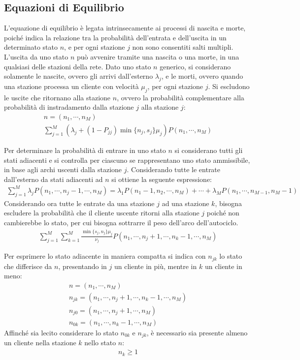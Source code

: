 \documentclass{article}
\numberwithin{equation}{subsection}
\begin{document}
\subsection{Equazioni di Equilibrio}

L'equazione di equilibrio è legata intrinsecamente ai processi di nascita e morte, poiché indica la relazione tra la probabilità dell'entrata e dell'uscita in un determinato 
stato $n$, e per ogni stazione $j$ non sono consentiti salti multipli. L'uscita da uno stato $n$ può avvenire tramite una nascita o una morte, in una qualsiasi delle stazioni della rete. Dato uno stato $n$ generico, si considerano  
solamente le nascite, ovvero gli arrivi dall'esterno $\lambda_j$, e le morti, ovvero quando una stazione processa un cliente con velocità $\mu_j$, per ogni stazione $j$. 
Si escludono le uscite che ritornano alla stazione $n$, ovvero la probabilità complementare alla probabilità di instradamento dalla stazione $j$ alla stazione $j$:
\begin{gather*} 
    n=(n_1,\cdots,n_M)\\
    \displaystyle\sum_{j=1}^M\left(\lambda_j+(1-P_{jj})\min\{n_j,s_j\}\mu_j\right)P(n_1,\cdots,n_M)
\end{gather*}

Per determinare la probabilità di entrare in uno stato $n$ si considerano tutti gli stati adiacenti e si controlla per ciascuno se rappresentano uno stato ammissibile, in 
base agli archi uscenti dalla stazione $j$. Considerando tutte le entrate dall'esterno da stati adiacenti ad $n$ si ottiene la seguente espressione:
\begin{gather*}
    \displaystyle\sum_{j=1}^M\lambda_jP(n_1,\cdots,n_j-1,\cdots,n_M)=\lambda_1P(n_1-1,n_2,\cdots,n_M)+\cdots+\lambda_MP(n_1,\cdots,n_{M-1},n_M-1)
\end{gather*}
Considerando ora tutte le entrate da una stazione $j$ ad una stazione $k$, bisogna escludere la probabilità che il cliente uscente ritorni alla stazione $j$ poiché non 
cambierebbe lo stato, per cui bisogna sottrarre il peso dell'arco dell'autociclo. 
\begin{gather*}
    \displaystyle\sum_{j=1}^M\sum_{k=1}^M\frac{\min\{s_j,n_j\}\mu_j}{\nu_j}P(n_1,\cdots,n_j+1,\cdots,n_k-1,\cdots,n_M)
\end{gather*}

Per esprimere lo stato adiacente in maniera compatta si indica con $n_{jk}$ lo stato che differisce da $n$, presentando in $j$ un cliente in più, mentre in $k$ un cliente in 
meno:
\begin{gather*}
    n=(n_1,\cdots,n_M)\\
    n_{jk}=(n_1,\cdots,n_j+1,\cdots,n_k-1,\cdots,n_M)\\
    n_{j0}=(n_1,\cdots,n_j+1,\cdots,n_M)\\
    n_{0k}=(n_1,\cdots,n_k-1,\cdots,n_M)
\end{gather*}
Affinché sia lecito considerare lo stato $n_{0k}$ e $n_{jk}$, è necessario sia presente almeno un cliente nella stazione $k$ nello stato $n$:
\begin{gather*}
    n_k\geq1
\end{gather*}
\end{document}
